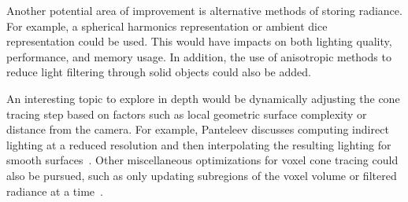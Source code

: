 Another potential area of improvement is alternative methods of storing radiance. For example, a spherical harmonics representation or ambient dice~\cite{iwanicki2017ambient} representation could be used. This would have impacts on both lighting quality, performance, and memory usage. In addition, the use of anisotropic methods to reduce light filtering through solid objects could also be added.

An interesting topic to explore in depth would be dynamically adjusting the cone tracing step based on factors such as local geometric surface complexity or distance from the camera. For example, Panteleev discusses computing indirect lighting at a reduced resolution and then interpolating the resulting lighting for smooth surfaces~\cite{practicalvxgi}. Other miscellaneous optimizations for voxel cone tracing could also be pursued, such as only updating subregions of the voxel volume or filtered radiance at a time~\cite{mclaren2016cascaded}.
